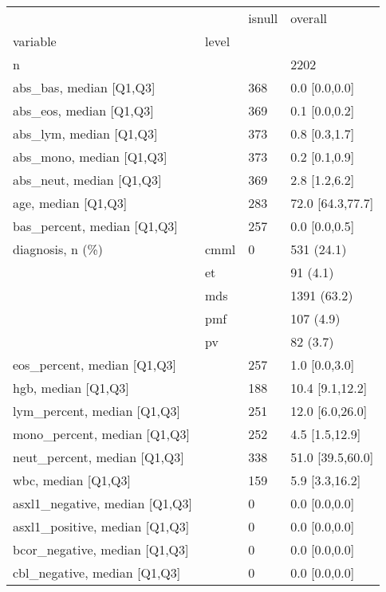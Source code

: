 \begin{tabular}{llll}
\toprule
                               &    & isnull &           overall \\
variable & level &        &                   \\
\midrule
n &    &        &              2202 \\
abs\_bas, median [Q1,Q3] &    &    368 &     0.0 [0.0,0.0] \\
abs\_eos, median [Q1,Q3] &    &    369 &     0.1 [0.0,0.2] \\
abs\_lym, median [Q1,Q3] &    &    373 &     0.8 [0.3,1.7] \\
abs\_mono, median [Q1,Q3] &    &    373 &     0.2 [0.1,0.9] \\
abs\_neut, median [Q1,Q3] &    &    369 &     2.8 [1.2,6.2] \\
age, median [Q1,Q3] &    &    283 &  72.0 [64.3,77.7] \\
bas\_percent, median [Q1,Q3] &    &    257 &     0.0 [0.0,0.5] \\
diagnosis, n (\%) & cmml &      0 &        531 (24.1) \\
                               & et &        &          91 (4.1) \\
                               & mds &        &       1391 (63.2) \\
                               & pmf &        &         107 (4.9) \\
                               & pv &        &          82 (3.7) \\
eos\_percent, median [Q1,Q3] &    &    257 &     1.0 [0.0,3.0] \\
hgb, median [Q1,Q3] &    &    188 &   10.4 [9.1,12.2] \\
lym\_percent, median [Q1,Q3] &    &    251 &   12.0 [6.0,26.0] \\
mono\_percent, median [Q1,Q3] &    &    252 &    4.5 [1.5,12.9] \\
neut\_percent, median [Q1,Q3] &    &    338 &  51.0 [39.5,60.0] \\
wbc, median [Q1,Q3] &    &    159 &    5.9 [3.3,16.2] \\
asxl1\_negative, median [Q1,Q3] &    &      0 &     0.0 [0.0,0.0] \\
asxl1\_positive, median [Q1,Q3] &    &      0 &     0.0 [0.0,0.0] \\
bcor\_negative, median [Q1,Q3] &    &      0 &     0.0 [0.0,0.0] \\
cbl\_negative, median [Q1,Q3] &    &      0 &     0.0 [0.0,0.0] \\

\end{tabular}
